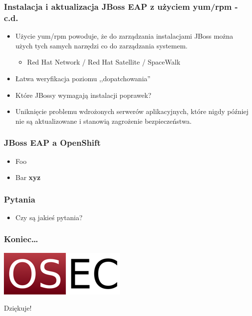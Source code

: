 \documentclass[dvipsnames,table]{beamer}
\begin{document}
\begin{frame}
\frametitle{Instalacja i aktualizacja JBoss EAP z użyciem yum/rpm - c.d.}
\begin{itemize}
	\item Użycie yum/rpm powoduje, że do zarządzania instalacjami JBoss można użych tych samych narzędzi co do zarządzania systemem.
	\begin{itemize}
		\item Red Hat Network / Red Hat Satellite / SpaceWalk
	\end{itemize}
	\item Łatwa weryfikacja poziomu ,,dopatchowania''
	\item Które JBossy wymagają instalacji poprawek?
	\item Uniknięcie problemu wdrożonych serwerów aplikacyjnych, które nigdy później nie są aktualizowane i stanowią zagrożenie bezpieczeństwa.


\end{itemize}
\end{frame}

\begin{frame}
\frametitle{JBoss EAP a OpenShift}
\begin{itemize}
	\item Foo
	\item Bar \textbf{xyz}
\end{itemize}
\end{frame}

\begin{frame}
\frametitle{Pytania}
\begin{itemize}
	\item Czy są jakieś pytania?
\end{itemize}
\end{frame}

\begin{frame}
\frametitle{Koniec\ldots}
\vspace*{-0.8cm}
\begin{center}
\includegraphics[scale=0.5]{img-oseclogo.png}

Dziękuje!
\end{center}
\end{frame}

 
\end{document}
